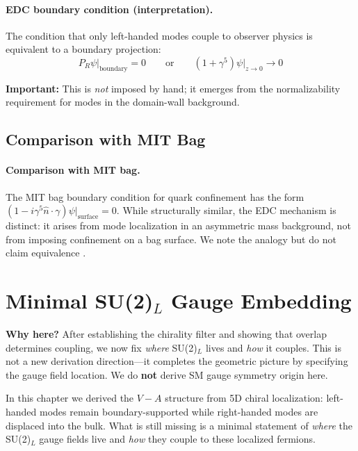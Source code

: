 \paragraph{EDC boundary condition (interpretation).}
The condition that only left-handed modes couple to observer physics is
equivalent to a boundary projection:
\begin{equation}
    P_R \psi\big|_{\text{boundary}} = 0
    \qquad \text{or} \qquad
    (1 + \gamma^5) \psi\big|_{z \to 0} \to 0
    \label{eq:ch9_bc}
\end{equation}

\textbf{Important:} This is \emph{not} imposed by hand; it emerges from the
normalizability requirement for modes in the domain-wall background.

\subsection{Comparison with MIT Bag}

\paragraph{Comparison with MIT bag.}
The MIT bag boundary condition for quark confinement has the form
$(1 - i\gamma^5 \hat{n} \cdot \gamma)\psi|_{\text{surface}} = 0$.
While structurally similar, the EDC mechanism is distinct: it arises from
mode localization in an asymmetric mass background, not from imposing
confinement on a bag surface. We note the analogy but do not claim equivalence \tagI{}.

\section{\texorpdfstring{Minimal SU(2)$_L$ Gauge Embedding}{Minimal SU(2)L Gauge Embedding}}
\label{sec:ch9_su2_embedding}

\textbf{Why here?} After establishing the chirality filter and showing that overlap
determines coupling, we now fix \emph{where} SU(2)$_L$ lives and \emph{how} it couples.
This is not a new derivation direction---it completes the geometric picture by specifying
the gauge field location. We do \textbf{not} derive SM gauge symmetry origin here.

\medskip

In this chapter we derived the $V{-}A$ structure from 5D chiral localization:
left-handed modes remain boundary-supported while right-handed modes are displaced
into the bulk. What is still missing is a minimal statement of \emph{where} the
SU(2)$_L$ gauge fields live and \emph{how} they couple to these localized fermions.

